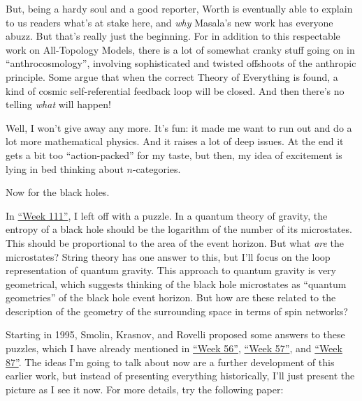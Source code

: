 \documentclass{article}
\def\tightlist{}
\renewcommand{\texttt}[1]{%
  \begingroup
  \ttfamily
  \begingroup\lccode`~=`/\lowercase{\endgroup\def~}{/\discretionary{}{}{}}%
  \begingroup\lccode`~=`[\lowercase{\endgroup\def~}{[\discretionary{}{}{}}%
  \begingroup\lccode`~=`.\lowercase{\endgroup\def~}{.\discretionary{}{}{}}%
  \catcode`/=\active\catcode`[=\active\catcode`.=\active
  \scantokens{#1\noexpand}%
  \endgroup
}
\begin{document}
But, being a hardy soul and a good reporter, Worth is eventually able to
explain to us readers what's at stake here, and \emph{why} Masala's new
work has everyone abuzz. But that's really just the beginning. For in
addition to this respectable work on All-Topology Models, there is a lot
of somewhat cranky stuff going on in ``anthrocosmology'', involving
sophisticated and twisted offshoots of the anthropic principle. Some
argue that when the correct Theory of Everything is found, a kind of
cosmic self-referential feedback loop will be closed. And then there's
no telling \emph{what} will happen!

Well, I won't give away any more. It's fun: it made me want to run out
and do a lot more mathematical physics. And it raises a lot of deep
issues. At the end it gets a bit too ``action-packed'' for my taste, but
then, my idea of excitement is lying in bed thinking about
\(n\)-categories.

Now for the black holes.

In \protect\hyperlink{week111}{``Week 111''}, I left off with a puzzle.
In a quantum theory of gravity, the entropy of a black hole should be
the logarithm of the number of its microstates. This should be
proportional to the area of the event horizon. But what \emph{are} the
microstates? String theory has one answer to this, but I'll focus on the
loop representation of quantum gravity. This approach to quantum gravity
is very geometrical, which suggests thinking of the black hole
microstates as ``quantum geometries'' of the black hole event horizon.
But how are these related to the description of the geometry of the
surrounding space in terms of spin networks?

Starting in 1995, Smolin, Krasnov, and Rovelli proposed some answers to
these puzzles, which I have already mentioned in
\protect\hyperlink{week56}{``Week 56''},
\protect\hyperlink{week57}{``Week 57''}, and
\protect\hyperlink{week87}{``Week 87''}. The ideas I'm going to talk
about now are a further development of this earlier work, but instead of
presenting everything historically, I'll just present the picture as I
see it now. For more details, try the following paper:

\end{document}
